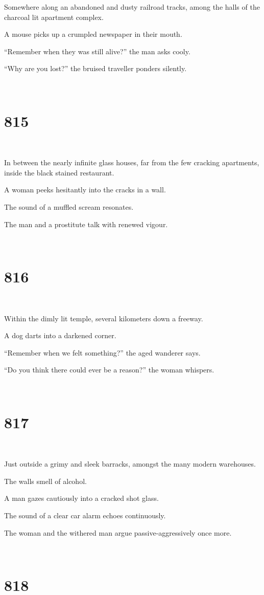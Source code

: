 \documentclass{report}
\begin{document}
Somewhere along an abandoned and dusty railroad tracks, among the halls of the charcoal lit apartment complex.

A mouse picks up a crumpled newspaper in their mouth.

``Remember when they was still alive?'' the man asks cooly.

``Why are you lost?'' the bruised traveller ponders silently.

~
\chapter*{815}
~

In between the nearly infinite glass houses, far from the few cracking apartments, inside the black stained restaurant.

A woman peeks hesitantly into the cracks in a wall.

The sound of a muffled scream resonates.

The man and a prostitute talk with renewed vigour.

~
\chapter*{816}
~

Within the dimly lit temple, several kilometers down a freeway.

A dog darts into a darkened corner.

``Remember when we felt something?'' the aged wanderer says.

``Do you think there could ever be a reason?'' the woman whispers.

~
\chapter*{817}
~

Just outside a grimy and sleek barracks, amongst the many modern warehouses.

The walls smell of alcohol.

A man gazes cautiously into a cracked shot glass.

The sound of a clear car alarm echoes continuously.

The woman and the withered man argue passive-aggressively once more.

~
\chapter*{818}
~
\end{document}
